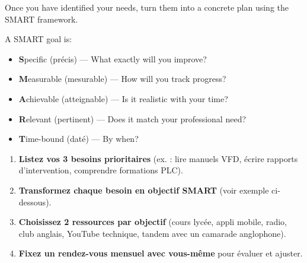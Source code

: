 \documentclass[11pt]{article}
\newcommand{\cle}[1]{{\popxbold\color{popdark}#1}}
\begin{document}
Once you have identified your needs, turn them into a concrete plan using the \cle{SMART} framework.

\begin{definition}
A \cle{SMART goal} is:
\begin{itemize}
    \item \textbf{S}pecific (précis) — What exactly will you improve?
    \item \textbf{M}easurable (mesurable) — How will you track progress?
    \item \textbf{A}chievable (atteignable) — Is it realistic with your time?
    \item \textbf{R}elevant (pertinent) — Does it match your professional need?
    \item \textbf{T}ime-bound (daté) — By when?
\end{itemize}
\end{definition}

\begin{methode}
\begin{enumerate}
    \item \textbf{Listez vos 3 besoins prioritaires} (ex. : lire manuels VFD, écrire rapports d'intervention, comprendre formations PLC).
    \item \textbf{Transformez chaque besoin en objectif SMART} (voir exemple ci-dessous).
    \item \textbf{Choisissez 2 ressources par objectif} (cours lycée, appli mobile, radio, club anglais, YouTube technique, tandem avec un camarade anglophone).
    \item \textbf{Fixez un rendez-vous mensuel avec vous-même} pour évaluer et ajuster.
\end{enumerate}
\end{methode}
\end{document}
